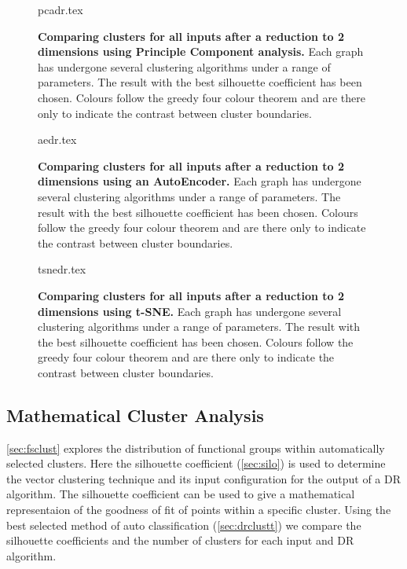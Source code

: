 \begin{landscape}
\begin{figure}[H]
    {pcadr.tex}
    \caption{\textbf{Comparing clusters for all inputs after a reduction to 2 dimensions using Principle Component analysis.}
    Each graph has undergone several clustering algorithms under a range of parameters. The result with the best silhouette coefficient has been chosen. Colours follow the greedy four colour theorem and are there only to indicate the contrast between cluster boundaries.}
    \label{fig:pcavis}
\end{figure}
\end{landscape}


\begin{landscape}
\begin{figure}[H]
    {aedr.tex}
    \caption{\textbf{Comparing clusters for all inputs after a reduction to 2 dimensions using an AutoEncoder.}
    Each graph has undergone several clustering algorithms under a range of parameters. The result with the best silhouette coefficient has been chosen. Colours follow the greedy four colour theorem and are there only to indicate the contrast between cluster boundaries.}
    \label{fig:aevis}
\end{figure}
\end{landscape}


\begin{landscape}
\begin{figure}[H]
    {tsnedr.tex}
    \caption{\textbf{Comparing clusters for all inputs after a reduction to 2 dimensions using t-SNE.}
    Each graph has undergone several clustering algorithms under a range of parameters. The result with the best silhouette coefficient has been chosen. Colours follow the greedy four colour theorem and are there only to indicate the contrast between cluster boundaries.}
    \label{fig:tsnevis}
\end{figure}
\end{landscape}



\subsection{Mathematical Cluster Analysis}\label{sec:mathclustanalysis}
\autoref{sec:fsclust} explores the distribution of functional groups within automatically selected clusters. Here the silhouette coefficient (\autoref{sec:silo}) is used to determine the vector clustering technique and its input configuration for the output of a DR algorithm. The silhouette coefficient can be used to give a mathematical representaion of the goodness of fit of points within a specific cluster. Using the best selected method of auto classification (\autoref{sec:drclustt}) we compare the silhouette coefficients and the number of clusters for each input and DR algorithm. 

